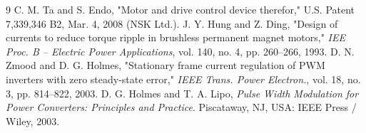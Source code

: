 \documentclass[11pt,a4paper]{article}
\begin{document}

\tableofcontents
\newpage



\setcounter{section}{8}


\begin{thebibliography}{9}
\small
{} C. M. Ta and S. Endo, "Motor and drive control device therefor," U.S. Patent 7,339,346 B2, Mar. 4, 2008 (NSK Ltd.).
 J. Y. Hung and Z. Ding, "Design of currents to reduce torque ripple in brushless permanent magnet motors," \emph{IEE Proc. B – Electric Power Applications}, vol. 140, no. 4, pp. 260–266, 1993.
 D. N. Zmood and D. G. Holmes, "Stationary frame current regulation of PWM inverters with zero steady-state error," \emph{IEEE Trans. Power Electron.}, vol. 18, no. 3, pp. 814–822, 2003.
 D. G. Holmes and T. A. Lipo, \emph{Pulse Width Modulation for Power Converters: Principles and Practice}. Piscataway, NJ, USA: IEEE Press / Wiley, 2003.
\end{thebibliography}
\end{document}
